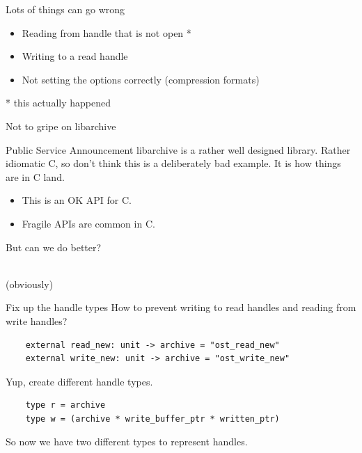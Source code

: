 \documentclass{beamer}
\renewcommand{\example}[1]{{\usebeamercolor[fg]{example text} #1}}
\begin{document}
\begin{frame}{Lots of things can go wrong}
  \begin{itemize}
    \item Reading from handle that is not open *
    \item Writing to a read handle
    \item Not setting the options correctly (compression formats)
  \end{itemize}
  \pause
  * this actually happened
\end{frame}

\begin{frame}{Not to gripe on libarchive}
  \begin{exampleblock}{Public Service Announcement}
    libarchive is a rather well designed library. Rather idiomatic C, so don't
    think this is a deliberately bad example. It is how things are in C land.
  \end{exampleblock}

  \begin{itemize}
    \item This is an OK API for C.
    \item Fragile APIs are common in C.
  \end{itemize}

  \vspace{2ex}
  \pause
  \begin{center}
    {\Large But can we do better?}
  \end{center}
\end{frame}

\begin{frame}
  \begin{center}
    {\fontsize{56pt}{54pt}\selectfont \example{Yes}}\\
    \pause
    {\scriptsize (obviously)}
  \end{center}
\end{frame}

\begin{frame}[fragile]{Fix up the handle types}
  How to prevent writing to read handles and reading from write handles?
  \begin{verbatim}
    external read_new: unit -> archive = "ost_read_new"
    external write_new: unit -> archive = "ost_write_new"
  \end{verbatim}
  \pause
  Yup, create different handle types.
  \begin{verbatim}
    type r = archive
    type w = (archive * write_buffer_ptr * written_ptr)
  \end{verbatim}
  So now we have two different types to represent handles.
\end{frame}
\end{document}
